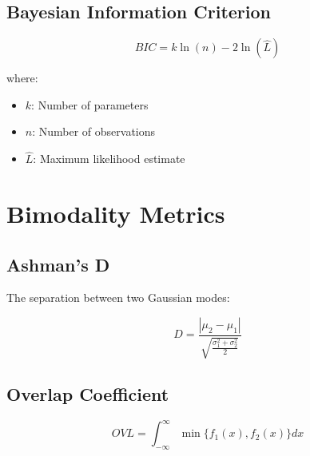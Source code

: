 \documentclass[11pt,a4paper]{article}
\begin{document}
\subsection{Bayesian Information Criterion}


\begin{equation}

BIC=
k\ln(n)-2\ln(\hat{L})

\end{equation}



where:


\begin{itemize}

\item $k$: Number of parameters

\item $n$: Number of observations

\item $\hat{L}$: Maximum likelihood estimate

\end{itemize}



\section{Bimodality Metrics}



\subsection{Ashman's D}


The separation between two Gaussian modes:


\begin{equation}

D=
\frac{
|\mu_2-\mu_1|
}
{
\sqrt{
\frac{\sigma_1^2+\sigma_2^2}{2}
}
}

\end{equation}



\subsection{Overlap Coefficient}



\begin{equation}

OVL=
\int_{-\infty}^{\infty}
\min
\{f_1(x),f_2(x)\}
dx

\end{equation}
\end{document}
